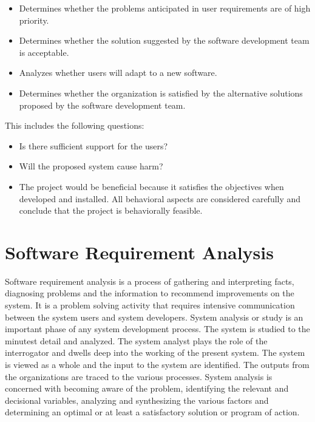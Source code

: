 \begin{itemize}
	\item Determines whether the problems anticipated in user requirements are of high priority.
	\item Determines whether the solution suggested by the software development team is acceptable.
	\item Analyzes whether users will adapt to a new software.
	\item Determines whether the organization is satisfied by the alternative solutions proposed by the software development team.
\end{itemize}

This includes the following questions:
\begin{itemize}
	\item Is there sufficient support for the users?
	\item Will the proposed system cause harm?
	\item The project would be beneficial because it satisfies the objectives when developed and installed. All behavioral aspects are considered carefully and conclude that the project is behaviorally feasible.
\end{itemize}

\section{Software Requirement Analysis}
Software requirement analysis is a process of gathering and interpreting facts, diagnosing problems and the information to recommend improvements on the system. It is a problem solving activity that requires intensive communication between the system users and system developers. System analysis or study is an important phase of any system development process. The system is studied to the minutest detail and analyzed. The system analyst plays the role of the interrogator and dwells deep into the working of the present system. The system is viewed as a whole and the input to the system are identified. The outputs from the organizations are traced to the various processes. System analysis is concerned with becoming aware of the problem, identifying the relevant and decisional variables, analyzing and synthesizing the various factors and determining an optimal or at least a satisfactory solution or program of action.\\

